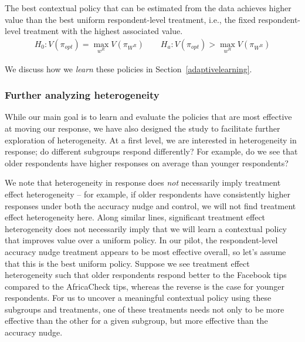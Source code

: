 \documentclass[letterpaper, 12pt, parskip=full,DIV=10]{scrartcl}
\begin{document}
  \begin{subhyp}
 The best contextual policy that can be estimated from the data achieves higher value than the best uniform respondent-level treatment, i.e., the fixed respondent-level treatment with the highest associated value. 
\begin{align}
  H_{0}: V(\pi_{opt}) = \max_{w^R} V(\pi_{W^R}) \qquad H_{a}:  V(\pi_{opt}) > \max_{w^R} V(\pi_{W^R})
\end{align}
\end{subhyp}

We discuss how we \textit{learn} these policies in Section~\ref{adaptivelearning}. 


\subsubsection{Further analyzing heterogeneity}\label{policieshte}

While our main goal is to learn and evaluate the policies that are most effective at moving our response, we have also designed the study to facilitate further exploration of heterogeneity. At a first level, we are interested in heterogeneity in response; do different subgroups respond differently? For example, do we see that older respondents have higher responses on average than younger respondents?

We note that heterogeneity in response does \textit{not} necessarily imply treatment effect heterogeneity -- for example, if older respondents have consistently higher responses under both the accuracy nudge and control, we will not find treatment effect heterogeneity here. Along similar lines, significant treatment effect heterogeneity does not necessarily imply that we will learn a contextual policy that improves value over a uniform policy. In our pilot, the respondent-level accuracy nudge treatment \citep{pennycook2020fighting} appears to be most effective overall, so let's assume that this is the best uniform policy. Suppose we see treatment effect heterogeneity such that older respondents respond better to the Facebook tips compared to the AfricaCheck tips, whereas the reverse is the case for younger respondents. For us to uncover a meaningful contextual policy using these subgroups and treatments, one of these treatments needs not only to be more effective than the other for a given subgroup, but more effective than the accuracy nudge.
\end{document}
